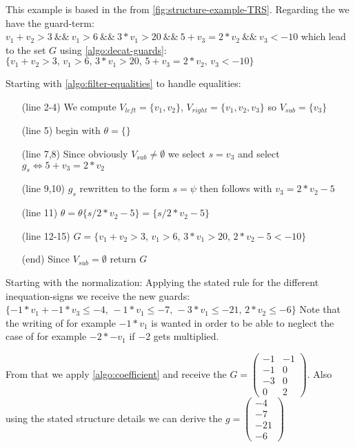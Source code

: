 \begin{example}
	\label{ex:derivation-guard}
	This example is based in the \its  from \autoref{fig:structure-example-TRS}.
	Regarding the \its we have the guard-term:\newline
	\hspace*{2cm}$v_1 + v_2 > 3 \>\&\&\> v_1 > 6 \>\&\&\> 3 * v_1 > 20 \>\&\&\> 5 + v_3 = 2 * v_2 \>\&\&\> v_3 < -10$\newline
	which lead to the set $G$ using \autoref{algo:decat-guards}:\newline
	\hspace*{2cm}$\{v_1 + v_2 > 3\text{, } v_1 > 6 \text{, } 3 * v_1 > 20 \text{, } 5 + v_3 = 2 * v_2 \text{, } v_3 < -10\}$\newline	
	
	Starting with \autoref{algo:filter-equalities} to handle equalities:
	\begin{enumerate}
		\setlength{\itemindent}{1in}
		\item[(line 2-4)] We compute $V_{left}=\{v_1, v_2\}$, $V_{right}=\{v_1,v_2,v_3\}$ so $V_{sub}=\{v_3\}$
		\item[(line 5)] begin with $\theta=\{\}$ 
		\item[(line 7,8)] Since obviously $V_{sub} \neq \emptyset$  we select $s=v_3$ and select $g_s \Leftrightarrow 5+v_3=2*v_2$
		\item[(line 9,10)] $g_s$ rewritten to the form $s=\psi$ then follows with $v_3=2*v_2-5$
		\item[(line 11)] $\theta = \theta\{s/2*v_2-5\} = \{s/2*v_2-5\}$
		\item[(line 12-15)] $G=\{v_1 + v_2 > 3$, $ v_1 > 6 $, $ 3 * v_1 > 20 $, $ 2*v_2-5 < -10\}$
		\item[(end)] Since $V_{sub}=\emptyset$ return $G$
	\end{enumerate}
	
	Starting with the normalization:\newline
	Applying the stated rule for the different inequation-signs we receive the new guards:\newline
	\hspace*{1cm}$\{-1*v_1+-1*v_3 \le -4\text{, } -1*v_1 \le -7 \text{, } -3*v_1 \le -21\text{, } 2*v_2\le -6\}$\newline
	Note that the writing of for example $-1*v_1$ is wanted in order to be able to neglect the case of for example $-2*-v_1$ if $-2$ gets multiplied.
	
	From that we apply \autoref{algo:coefficient} and receive the \guardmatrix  $G = \begin{pmatrix} -1 & -1 \\ -1 & 0 \\ -3 & 0 \\ 0 & 2 \end{pmatrix}$. Also using the stated structure details we can derive the \guardconstants $g= \begin{pmatrix} -4 \\ -7 \\ -21 \\ -6 \end{pmatrix}$
\end{example}

